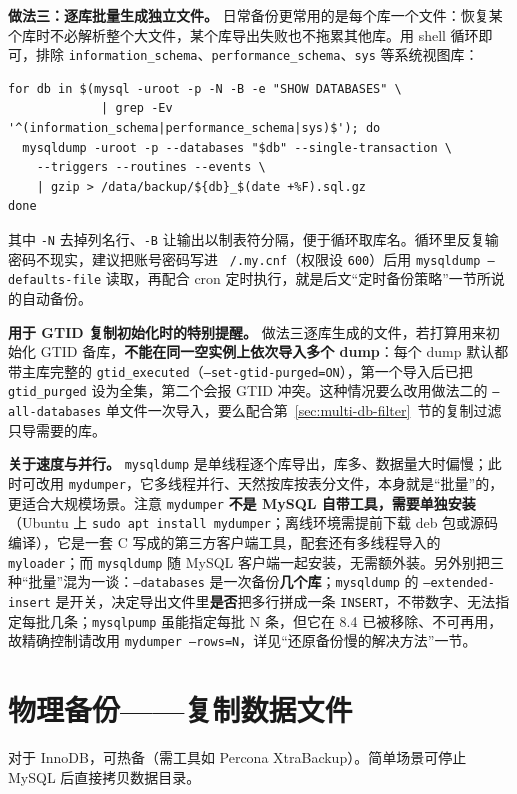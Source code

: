 \documentclass[12pt,UTF8]{ctexbook}
\begin{document}
\textbf{做法三：逐库批量生成独立文件。} 日常备份更常用的是每个库一个文件：恢复某个库时不必解析整个大文件，某个库导出失败也不拖累其他库。用 shell 循环即可，排除 \texttt{information\_schema}、\texttt{performance\_schema}、\texttt{sys} 等系统视图库：

\begin{lstlisting}
for db in $(mysql -uroot -p -N -B -e "SHOW DATABASES" \
             | grep -Ev '^(information_schema|performance_schema|sys)$'); do
  mysqldump -uroot -p --databases "$db" --single-transaction \
    --triggers --routines --events \
    | gzip > /data/backup/${db}_$(date +%F).sql.gz
done
\end{lstlisting}

其中 \texttt{-N} 去掉列名行、\texttt{-B} 让输出以制表符分隔，便于循环取库名。循环里反复输密码不现实，建议把账号密码写进 \texttt{~/.my.cnf}（权限设 \texttt{600}）后用 \texttt{mysqldump --defaults-file} 读取，再配合 cron 定时执行，就是后文“定时备份策略”一节所说的自动备份。

\textbf{用于 GTID 复制初始化时的特别提醒。} 做法三逐库生成的文件，若打算用来初始化 GTID 备库，\textbf{不能在同一空实例上依次导入多个 dump}：每个 dump 默认都带主库完整的 \texttt{gtid\_executed}（\texttt{--set-gtid-purged=ON}），第一个导入后已把 \texttt{gtid\_purged} 设为全集，第二个会报 GTID 冲突。这种情况要么改用做法二的 \texttt{--all-databases} 单文件一次导入，要么配合第~\ref{sec:multi-db-filter}~节的复制过滤只导需要的库。

\textbf{关于速度与并行。} \texttt{mysqldump} 是单线程逐个库导出，库多、数据量大时偏慢；此时可改用 \texttt{mydumper}，它多线程并行、天然按库按表分文件，本身就是“批量”的，更适合大规模场景。注意 \texttt{mydumper} \textbf{不是 MySQL 自带工具，需要单独安装}（Ubuntu 上 \texttt{sudo apt install mydumper}；离线环境需提前下载 deb 包或源码编译），它是一套 C 写成的第三方客户端工具，配套还有多线程导入的 \texttt{myloader}；而 \texttt{mysqldump} 随 MySQL 客户端一起安装，无需额外装。另外别把三种“批量”混为一谈：\texttt{--databases} 是一次备份\textbf{几个库}；\texttt{mysqldump} 的 \texttt{--extended-insert} 是开关，决定导出文件里\textbf{是否}把多行拼成一条 \texttt{INSERT}，不带数字、无法指定每批几条；\texttt{mysqlpump} 虽能指定每批 N 条，但它在 8.4 已被移除、不可再用，故精确控制请改用 \texttt{mydumper --rows=N}，详见“还原备份慢的解决方法”一节。

\section{物理备份——复制数据文件}
对于 InnoDB，可热备（需工具如 Percona XtraBackup）。简单场景可停止 MySQL 后直接拷贝数据目录。
\end{document}
